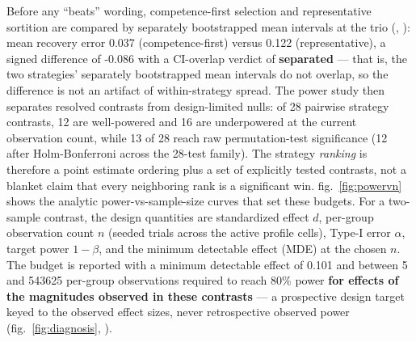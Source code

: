 \documentclass[
]{article}
\begin{document}
Before any ``beats'' wording, competence-first selection and
representative sortition are compared by separately bootstrapped mean
intervals at the trio (,
): mean recovery
error 0.037 (competence-first) versus 0.122 (representative), a signed
difference of -0.086 with a CI-overlap verdict of \textbf{separated} ---
that is, the two strategies' separately bootstrapped mean intervals do
not overlap, so the difference is not an artifact of within-strategy
spread. The power study then separates resolved contrasts from
design-limited nulls: of 28 pairwise strategy contrasts, 12 are
well-powered and 16 are underpowered at the current observation count,
while 13 of 28 reach raw permutation-test significance (12 after
Holm-Bonferroni across the 28-test family). The strategy \emph{ranking}
is therefore a point estimate ordering plus a set of explicitly tested
contrasts, not a blanket claim that every neighboring rank is a
significant win. fig.~\ref{fig:powervn} shows the analytic
power-vs-sample-size curves that set these budgets. For a two-sample
contrast, the design quantities are standardized effect \(d\), per-group
observation count \(n\) (seeded trials across the active profile cells),
Type-I error \(\alpha\), target power \(1-\beta\), and the minimum
detectable effect (MDE) at the chosen \(n\). The budget is reported with
a minimum detectable effect of 0.101 and between 5 and 543625 per-group
observations required to reach 80\% power \textbf{for effects of the
magnitudes observed in these contrasts} --- a prospective design target
keyed to the observed effect sizes, never retrospective observed power
(fig.~\ref{fig:diagnosis}, ).
\end{document}
